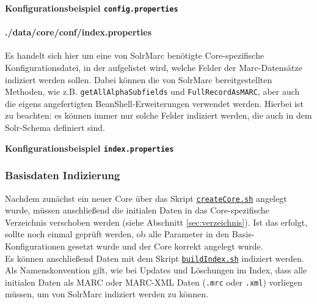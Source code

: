 \documentclass[10pt]{article}
\begin{document}
\textbf{Konfigurationsbeispiel \texttt{config.properties}} 


\paragraph{./data/core/conf/index.properties}
\label{para:index.properties}
Es handelt sich hier um eine von SolrMarc benötigte Core-spezifische Konfigurationsdatei, in der aufgelistet wird, welche Felder der Marc-Datensätze indiziert werden sollen. Dabei können die von SolrMarc bereitgestellten Methoden, wie z.B. \texttt{getAllAlphaSubfields} und \texttt{FullRecordAsMARC}, aber auch die eigens angefertigten BeanShell-Erweiterungen verwendet werden. Hierbei ist zu beachten: es können immer nur solche Felder indiziert werden, die auch in dem Solr-Schema definiert sind. 

\textbf{Konfigurationsbeispiel \texttt{index.properties}} 


\subsubsection{Basisdaten Indizierung}
\label{sec:subsub:Basis}
Nachdem zunächst ein neuer Core über das Skript \hyperref[sec:para:createCore]{\texttt{createCore.sh}} angelegt wurde, müssen anschließend die initialen Daten in das Core-spezifische Verzeichnis verschoben werden (siehe Abschnitt \ref{sec:verzeichnis}). Ist das erfolgt, sollte noch einmal geprüft werden, ob alle Parameter in den Basis-Konfigurationen gesetzt wurde und der Core korrekt angelegt wurde. \\
Es können anschließend Daten mit dem Skript \hyperref[sec:para:buildIndex]{\texttt{buildIndex.sh}} indiziert werden. Als Namenskonvention gilt, wie bei Updates und Löschungen im Index, dass alle initialen Daten als MARC oder MARC-XML Daten (\texttt{.mrc} oder \texttt{.xml}) vorliegen müssen, um von SolrMarc indiziert werden zu können. 
\end{document}
